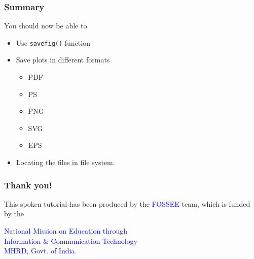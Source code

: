 \documentclass[presentation]{beamer}
\begin{document}
\begin{frame}
\frametitle{Summary}
\label{sec-8}

  You should now be able to
\begin{itemize}
\item Use \texttt{savefig()} function
\item Save plots in different formats

\begin{itemize}
\item PDF
\item PS
\item PNG
\item SVG
\item EPS
\end{itemize}

\item Locating the files in file system.
\end{itemize}

    
\end{frame}
\begin{frame}
\frametitle{Thank you!}
\label{sec-9}

  \begin{block}{}
  \begin{center}
  This spoken tutorial has been produced by the
  \textcolor{blue}{FOSSEE} team, which is funded by the 
  \end{center}
  \begin{center}
    \textcolor{blue}{National Mission on Education through \\
      Information \& Communication Technology \\ 
      MHRD, Govt. of India}.
  \end{center}  
  \end{block}
\end{frame}
\end{document}
